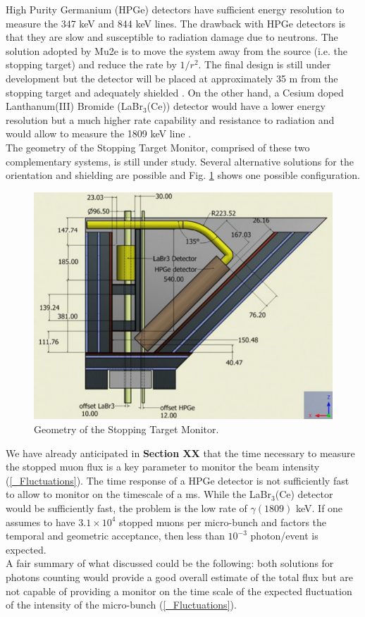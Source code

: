 \documentclass[12pt,a4paper,openright, oneside, titlepage]{book} %
\begin{document}
\noindent
High Purity Germanium (HPGe) detectors have sufficient energy resolution to measure the 347 keV and 844 keV lines. 
The drawback with HPGe detectors is that they are slow and susceptible to radiation damage due to neutrons. 
The solution adopted by Mu2e is to move the system away from the source (i.e. the stopping target) and
reduce the rate by $1/r^2$. 
The final design is still under development but the detector will be placed at approximately 35 m from the stopping target and adequately shielded \cite{STM:2016}. 
On the other hand, a Cesium doped Lanthanum(III) Bromide (LaBr$_3$(Ce)) detector would have a lower energy resolution 
but a much higher rate capability and resistance to radiation and would allow to measure the 1809 keV line \cite{LaBr3:2020}.\\
The geometry of the Stopping Target Monitor, comprised of these two complementary systems, is still under study. 
Several alternative solutions for the orientation and shielding are possible and Fig. \ref{_STM_geom} shows one possible configuration.

\begin{figure}[h!]
\centering
\includegraphics[scale=0.6]{STM_geom}
\caption{Geometry of the Stopping Target Monitor.}
\label{_STM_geom}
\end{figure}

\noindent
We have already anticipated in {\bf{Section XX}} that the time necessary to measure the stopped muon flux is a key parameter to monitor
the beam intensity (\ref{_Fluctuations}). 
The time response of a HPGe detector is not sufficiently fast to allow to monitor on the timescale of a ms.
While the LaBr$_3$(Ce) detector would be sufficiently fast, 
the problem is the low rate of $\gamma(1809)$ keV.
If one assumes to have $3.1\times10^4$ stopped muons per micro-bunch and factors 
the temporal and geometric acceptance, 
then less than $10^{-3}$ photon/event is expected.\\ 
A fair summary of what discussed could be the following: 
both solutions for photons counting would provide a good overall estimate of the total flux 
but are not capable of providing a monitor on the time scale of the expected fluctuation 
of the intensity of the micro-bunch (\ref{_Fluctuations}).
\end{document}
